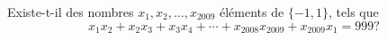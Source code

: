 \documentclass[varwidth]{standalone}
\begin{document}
    Existe-t-il des nombres $x_1, x_2, \dots, x_{2009}$ \'el\'ements de $\{ -1, 1 \}$, tels que
    \[
        x_1 x_2 + x_2 x_3 + x_3 x_4 + \dotsb + x_{2008} x_{2009} + x_{2009} x_1 = 999?  
    \]
\end{document}
